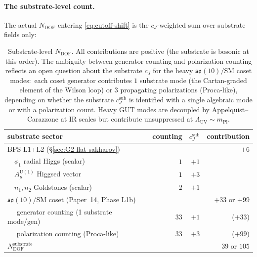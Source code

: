 \documentclass[11pt]{article}
\newcommand{\so}{\mathfrak{so}}
\newcommand{\mPl}{m_{\mathrm{Pl}}}
\newcommand{\U}{\mathrm{U}}
\begin{document}
\paragraph{The substrate-level count.}
The actual $N_{\mathrm{DOF}}$ entering \eqref{eq:cutoff-shift} is
the $c_J$-weighted sum over substrate fields only:
\begin{table}[H]
\centering
\begin{tabular}{lrrr}
\toprule
\textbf{substrate sector} & \textbf{counting} & \textbf{$c_J^{\mathrm{sub}}$} & \textbf{contribution} \\
\midrule
BPS L1+L2 (\S\ref{sec:G2-flat-sakharov})         &     &     & $+6$ \\
$\quad\phi_1$ radial Higgs (scalar)              & $1$ & $+1$ & \\
$\quad A_\mu^{\U(1)}$ Higgsed vector             & $1$ & $+3$ & \\
$\quad n_1, n_2$ Goldstones (scalar)             & $2$ & $+1$ & \\
\midrule
$\so(10)/\mathrm{SM}$ coset (Paper~14, Phase L1b) &    &     & $+33$ or $+99$ \\
$\quad$ generator counting (1 substrate mode/gen) & $33$ & $+1$ & ($+33$) \\
$\quad$ polarization counting (Proca-like)        & $33$ & $+3$ & ($+99$) \\
\midrule
\midrule
$N_{\mathrm{DOF}}^{\mathrm{substrate}}$           &     &     & $39$ or $105$ \\
\bottomrule
\end{tabular}
\caption{Substrate-level $N_{\mathrm{DOF}}$.  All contributions are
positive (the substrate is bosonic at this order).  The ambiguity
between generator counting and polarization counting reflects an
open question about the substrate $c_J$ for the heavy
$\so(10)/\mathrm{SM}$ coset modes:\ each coset generator contributes
$1$ substrate mode (the Cartan-graded element of the Wilson loop)
or $3$ propagating polarizations (Proca-like), depending on whether
the substrate $c_J^{\mathrm{sub}}$ is identified with a single
algebraic mode or with a polarization count.  Heavy GUT modes are
decoupled by Appelquist--Carazzone at IR scales but contribute
unsuppressed at $\Lambda_{\mathrm{UV}} \sim \mPl$.}
\label{tab:N-substrate}
\end{table}
\end{document}
